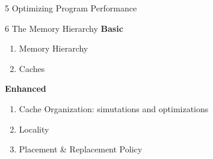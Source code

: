 \documentclass{beamer}
\begin{document}
\begin{frame}{5 Optimizing Program Performance}
	\only<1> {
	}
	 {
	}
\end{frame}


\begin{frame}{6 The Memory Hierarchy}
\textbf{Basic}
\begin{enumerate}
	\item Memory Hierarchy
	\item Caches
\end{enumerate}
\textbf{Enhanced}
\begin{enumerate}
	\item Cache Organization: simutations and optimizations
	\item Locality
	\item Placement \& Replacement Policy
\end{enumerate}
\end{frame}
\end{document}
